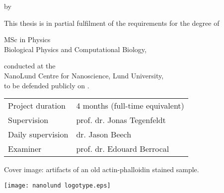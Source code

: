 {
\pagestyle{empty}



\clearpage

\begin{titlepage}
	
	\frutigerfont
	
	\begin{center}

		
		{\Huge \garamondfont \thetitle}
		
		\smallskip
		by
		\bigskip
		
		{\Large \garamondfont \theauthor}
		
		\bigskip
		\bigskip
		
		This thesis is in partial fulfilment of the requirements for the degree of 
		
		\bigskip
		
		{MSc in Physics} \\
		Biological Physics and Computational Biology,
		
		\bigskip
		
		conducted at the \\
		NanoLund Centre for Nanoscience, Lund University,\\
		to be defended publicly on .
		
		
		\vspace{5cm}
		
		\vfill
		\begin{tabular}{ll}
			Project duration & 4 months (full-time equivalent)\\
			Supervision & prof. dr. Jonas Tegenfeldt\\
			Daily supervision & dr. Jason Beech\\
			Examiner & prof. dr. Edouard Berrocal
		\end{tabular}
	
		\bigskip
	
		Cover image: artifacts of an old actin-phalloidin stained sample.
	
		\vspace{3cm}
		
		\texttt{[image: nanolund logotype.eps]}
	
	
	\end{center}
\end{titlepage}
}